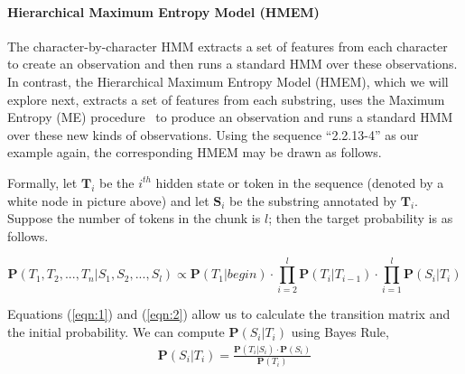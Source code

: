 \paragraph*{Hierarchical Maximum Entropy Model (HMEM)}\label{subsec:hmem}

The character-by-character HMM extracts a set of features from each character
to create an observation and then runs a standard HMM over these observations.
In contrast, the Hierarchical Maximum Entropy Model (HMEM), which we
will explore next, extracts a set of features from each substring, uses
the Maximum Entropy (ME) procedure~\cite{Berger96:ME,megaweb}
to produce an observation and runs a standard HMM over these new kinds
of observations.  
Using the sequence ``2.2.13-4'' as our example again, the corresponding
HMEM may be drawn as follows.

\begin{center}
\end{center}


Formally, let $\mathbf{T}_i$ be the $i^{th}$ hidden state or token in the
sequence (denoted by a white node in picture above) and
let $\mathbf{S}_i$ be the substring annotated by $\mathbf{T}_i$. 
Suppose the number of tokens in the chunk is $l$; then the
target probability is as follows.

\begin{equation}
\mathbf{P}(T_1, T_2, ..., T_n|S_1, S_2, ..., S_l)  \propto
\mathbf{P}(T_1|begin) \cdot \prod_{i=2}^{l}{\mathbf{P}(T_i|T_{i-1})}
\cdot \prod_{i=1}^{l}\mathbf{P}(S_i|T_i)
\end{equation}

Equations (\ref{eqn:1}) and (\ref{eqn:2}) allow us to calculate
the transition matrix and the initial probability.
We can compute $\mathbf{P}(S_i|T_i)$ using Bayes Rule,
\begin{eqnarray} \label{eqn:bayes}
\mathbf{P}(S_i|T_i) = \frac{\mathbf{P}(T_i|S_i) \cdot
\mathbf{P}(S_i)}{\mathbf{P}(T_i)}
\end{eqnarray}

